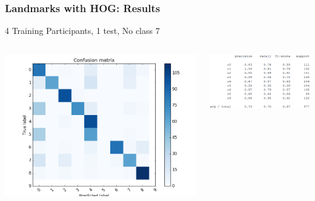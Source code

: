 \documentclass{beamer}
\begin{document}
	\begin{frame}
		\frametitle{Landmarks with HOG: Results}
		4 Training Participants, 1 test, No class 7
		\begin{columns}
			\begin{column}{0.5\textwidth}
				\begin{center}
					\includegraphics[width=\textwidth]{mult_HOG/4c012345689matComparable}\\			
				\end{center}
			\end{column}
			\begin{column}{0.5\textwidth}
				\begin{center}
					\includegraphics[width=\textwidth]{mult_HOG/4c012345689repComparable}
				\end{center}
			\end{column}
		\end{columns}		
	\end{frame}
	
\end{document}
